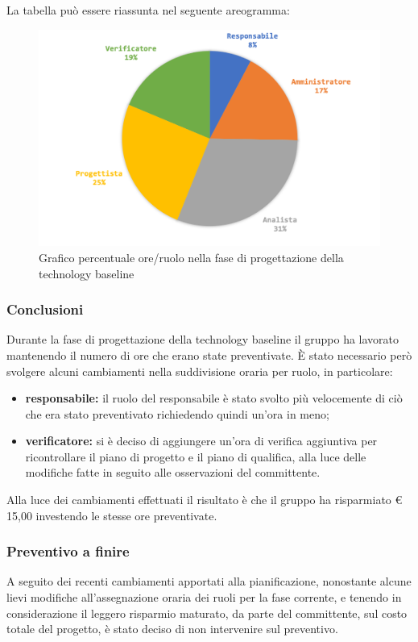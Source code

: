 			La tabella può essere riassunta nel seguente areogramma:
			\begin{figure}[H]
				\centering
				\includegraphics[width=0.8\linewidth]{images/consuntivo/ConsCorrez2.png}
				\caption{Grafico percentuale ore/ruolo nella fase di progettazione della technology baseline}
				\label{fig:consuntivo grafico costi ruolo fase progettazione della technology baseline}
			\end{figure}

		\subsubsection{Conclusioni}
			Durante la fase di progettazione della technology baseline il gruppo ha lavorato mantenendo il numero di ore che erano state preventivate. È stato necessario però svolgere alcuni cambiamenti nella suddivisione oraria per ruolo, in particolare:
			\begin{itemize}
				\item \textbf{responsabile:} il ruolo del responsabile è stato svolto più velocemente di ciò che era stato preventivato richiedendo quindi un'ora in meno;
				\item \textbf{verificatore:} si è deciso di aggiungere un'ora di verifica aggiuntiva per ricontrollare il piano di progetto e il piano di qualifica, alla luce delle modifiche fatte in seguito alle osservazioni del committente.
			\end{itemize}
			Alla luce dei cambiamenti effettuati il risultato è che il gruppo ha risparmiato € 15,00 investendo le stesse ore preventivate.
		
		\subsubsection{Preventivo a finire}
			A seguito dei recenti cambiamenti apportati alla pianificazione, nonostante alcune lievi modifiche all'assegnazione oraria dei ruoli per la fase corrente, e tenendo in considerazione il leggero risparmio maturato, da parte del committente, sul costo totale del progetto, è stato deciso di non intervenire sul preventivo.	
		
